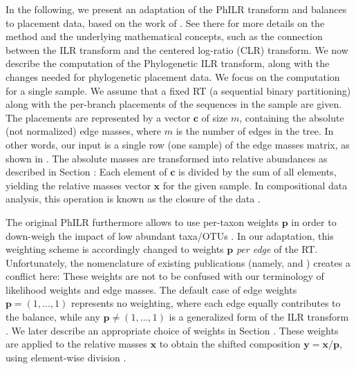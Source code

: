 
In the following, we present an adaptation of the PhILR transform and balances to placement data,
based on the work of \cite{Silverman2017}.
See there for more details on the method and the underlying mathematical concepts,
such as the connection between the ILR transform and the centered log-ratio (CLR) transform.
We now describe the computation of the Phylogenetic ILR transform,
along with the changes needed for phylogenetic placement data.
We focus on the computation for a single sample.
We assume that a fixed \acf{RT} (a sequential binary partitioning)
along with the per-branch placements of the sequences in the sample are given.
The placements are represented by a vector $\bm{c}$ of size $m$, containing the absolute (not normalized) edge masses,
where $m$ is the number of edges in the tree.
In other words, our input is a single row (one sample)
of the edge masses matrix, as shown in .
The absolute masses are transformed into relative abundances as described in Section :
Each element of $\bm{c}$ is divided by the sum of all elements,
yielding the relative masses vector $\bm{x}$ for the given sample.
In compositional data analysis, this operation is known as the closure of the data \cite{Aitchison1986}.


The original PhILR furthermore allows to use per-taxon weights $\bm{p}$
in order to down-weigh the impact of low abundant taxa/OTUs \cite{Egozcue2016,Silverman2017}.
In our adaptation, this weighting scheme is accordingly changed to weights $\bm{p}$ \emph{per edge} of the \ac{RT}.
Unfortunately, the nomenclature of existing publications
(namely, \cite{Matsen2011a} and \cite{Silverman2017}) creates a conflict here:
These weights are not to be confused with our terminology of likelihood weights and edge masses.
The default case of edge weights $\bm{p} = ( 1, \ldots, 1 )$ represents no weighting,
where each edge equally contributes to the balance,
while any $\bm{p} \neq ( 1, \ldots, 1 )$ is a generalized form of the ILR transform \cite{Silverman2017}.
We later describe an appropriate choice of weights
in Section .
These weights are applied to the relative masses $\bm{x}$ to obtain the shifted composition $\bm{y} = \bm{x} / \bm{p}$,
using element-wise division \cite{Egozcue2016}.

